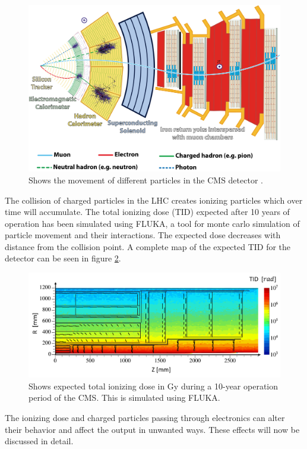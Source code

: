 \begin{figure}[H]
    \centering
    \includegraphics[width=\linewidth]{subfiles/imgs/CMSslice_whiteBackground.png}
    \caption{Shows the movement of different particles in the CMS detector \cite{Barney:2120661}.}
    \label{fig:particles_in_cms}
\end{figure}

The collision of charged particles in the LHC creates ionizing particles which over time will accumulate. The total ionizing dose (TID) expected after 10 years of operation has been simulated using FLUKA, a tool for monte carlo simulation of particle movement and their interactions. The expected dose decreases with distance from the collision point. A complete map of the expected TID for the detector can be seen in figure \ref{fig:tid_in_cms}.  

\begin{figure}[H]
    \centering
    \includegraphics[width=\linewidth]{subfiles/imgs/CMS_RadiationLevels_2.png}
    \caption{Shows expected total ionizing dose in \si{Gy} during a 10-year operation period of the CMS. This is simulated using FLUKA. \cite{cms_tdr}}
    \label{fig:tid_in_cms}
\end{figure}

The ionizing dose and charged particles passing through electronics can alter their behavior and affect the output in unwanted ways. These effects will now be discussed in detail. 
